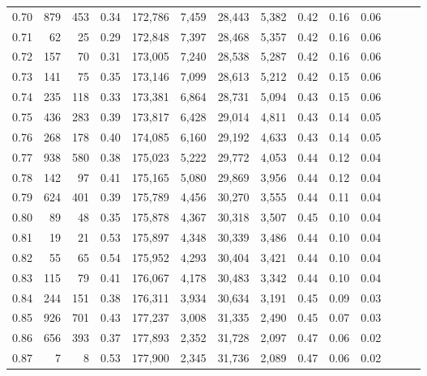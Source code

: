 \begin{tabular}{rrrrrrrrrrrrrr}
0.70 &     879 &    453 &  0.34 &  172,786 &    7,459 &  28,443 &   5,382 &  0.42 &  0.16 &      0.06 \\
0.71 &      62 &     25 &  0.29 &  172,848 &    7,397 &  28,468 &   5,357 &  0.42 &  0.16 &      0.06 \\
0.72 &     157 &     70 &  0.31 &  173,005 &    7,240 &  28,538 &   5,287 &  0.42 &  0.16 &      0.06 \\
0.73 &     141 &     75 &  0.35 &  173,146 &    7,099 &  28,613 &   5,212 &  0.42 &  0.15 &      0.06 \\
0.74 &     235 &    118 &  0.33 &  173,381 &    6,864 &  28,731 &   5,094 &  0.43 &  0.15 &      0.06 \\
0.75 &     436 &    283 &  0.39 &  173,817 &    6,428 &  29,014 &   4,811 &  0.43 &  0.14 &      0.05 \\
0.76 &     268 &    178 &  0.40 &  174,085 &    6,160 &  29,192 &   4,633 &  0.43 &  0.14 &      0.05 \\
0.77 &     938 &    580 &  0.38 &  175,023 &    5,222 &  29,772 &   4,053 &  0.44 &  0.12 &      0.04 \\
0.78 &     142 &     97 &  0.41 &  175,165 &    5,080 &  29,869 &   3,956 &  0.44 &  0.12 &      0.04 \\
0.79 &     624 &    401 &  0.39 &  175,789 &    4,456 &  30,270 &   3,555 &  0.44 &  0.11 &      0.04 \\
0.80 &      89 &     48 &  0.35 &  175,878 &    4,367 &  30,318 &   3,507 &  0.45 &  0.10 &      0.04 \\
0.81 &      19 &     21 &  0.53 &  175,897 &    4,348 &  30,339 &   3,486 &  0.44 &  0.10 &      0.04 \\
0.82 &      55 &     65 &  0.54 &  175,952 &    4,293 &  30,404 &   3,421 &  0.44 &  0.10 &      0.04 \\
0.83 &     115 &     79 &  0.41 &  176,067 &    4,178 &  30,483 &   3,342 &  0.44 &  0.10 &      0.04 \\
0.84 &     244 &    151 &  0.38 &  176,311 &    3,934 &  30,634 &   3,191 &  0.45 &  0.09 &      0.03 \\
0.85 &     926 &    701 &  0.43 &  177,237 &    3,008 &  31,335 &   2,490 &  0.45 &  0.07 &      0.03 \\
0.86 &     656 &    393 &  0.37 &  177,893 &    2,352 &  31,728 &   2,097 &  0.47 &  0.06 &      0.02 \\
0.87 &       7 &      8 &  0.53 &  177,900 &    2,345 &  31,736 &   2,089 &  0.47 &  0.06 &      0.02 \\

\end{tabular}
